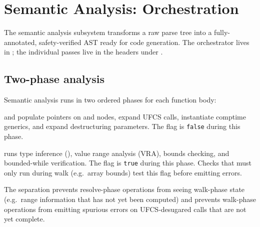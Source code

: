 \chapter{Semantic Analysis: Orchestration}
\label{chap:09-sema-orchestration}

\pnum
The semantic analysis subsystem transforms a raw parse tree into a fully-annotated,
safety-verified AST ready for code generation.  The orchestrator lives in
; the individual passes live in the headers under
.

\section{Two-phase analysis}
\label{sec:sema-twophase}

\pnum
Semantic analysis runs in two ordered phases for each function body:

\begin{description}[leftmargin=3cm, style=nextline]
\item[Phase 1 — Resolve.]
   and  populate
   pointers on  and 
  nodes, expand UFCS calls, instantiate comptime generics, and expand
  destructuring parameters.  The flag  is
  \texttt{false} during this phase.
\item[Phase 2 — Walk.]
   runs type inference (), value
  range analysis (VRA), bounds checking, and bounded-while verification.  The
  flag  is \texttt{true} during this phase.  Checks
  that must only run during walk (e.g.\ array bounds) test this flag before
  emitting errors.
\end{description}

\pnum
The separation prevents resolve-phase operations from seeing walk-phase state
(e.g.\ range information that has not yet been computed) and prevents walk-phase
operations from emitting spurious errors on UFCS-desugared calls that are not
yet complete.

